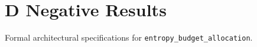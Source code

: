 \section{D Negative Results}

Formal architectural specifications for \texttt{entropy_budget_allocation}.
